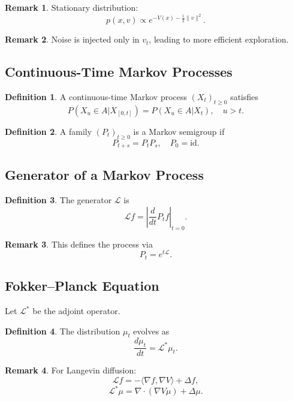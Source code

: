 \documentclass[12pt,oneside]{book}
\numberwithin{equation}{section}
\theoremstyle{definition}
\newtheorem{definition}{Definition}[section]
\newtheorem{remark}{Remark}[section]
\theoremstyle{plain}
\theoremstyle{remark}
\begin{document}
\begin{remark}
Stationary distribution:
\[
p(x,v) \propto e^{-V(x) - \frac{1}{2}\|v\|^2}.
\]
\end{remark}

\begin{remark}
Noise is injected only in $v_t$, leading to more efficient exploration.
\end{remark}


\subsection*{Continuous-Time Markov Processes}

\begin{definition}
A continuous-time Markov process $(X_t)_{t \ge 0}$ satisfies
\[
P(X_u \in A | X_{[0,t]}) = P(X_u \in A | X_t), \quad u > t.
\]
\end{definition}

\begin{definition}
A family $(P_t)_{t \ge 0}$ is a Markov semigroup if
\[
P_{t+s} = P_t P_s, \quad P_0 = \mathrm{id}.
\]
\end{definition}


\subsection*{Generator of a Markov Process}

\begin{definition}
The generator $\mathcal{L}$ is
\[
\mathcal{L}f = \left|\frac{d}{dt} P_t f \right|_{t=0}.
\]
\end{definition}

\begin{remark}
This defines the process via
\[
P_t = e^{t\mathcal{L}}.
\]
\end{remark}


\subsection{Fokker--Planck Equation}

Let $\mathcal{L}^*$ be the adjoint operator.

\begin{definition}
The distribution $\mu_t$ evolves as
\[
\frac{d\mu_t}{dt} = \mathcal{L}^* \mu_t.
\]
\end{definition}

\begin{remark}
For Langevin diffusion:
\[
\mathcal{L}f = -\langle \nabla f, \nabla V\rangle + \Delta f,
\]
\[
\mathcal{L}^* \mu = \nabla \cdot (\nabla V \mu) + \Delta \mu.
\]
\end{remark}
\end{document}
